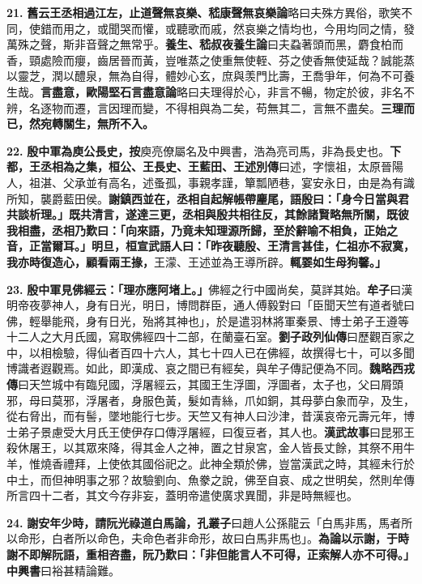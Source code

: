 \textbf{21.} \textbf{舊云王丞相過江左，止道聲無哀樂、}{\footnotesize \textbf{嵇康聲無哀樂論}略曰夫殊方異俗，歌笑不同，使錯而用之，或聞哭而懽，或聽歌而戚，然哀樂之情均也，今用均同之情，發萬殊之聲，斯非音聲之無常乎。}\textbf{養生、}{\footnotesize \textbf{嵇叔夜養生論}曰夫蝨著頭而黑，麝食柏而香，頸處險而癭，齒居晉而黃，豈唯蒸之使重無使輊、芬之使香無使延哉？誠能蒸以靈芝，潤以醴泉，無為自得，體妙心玄，庶與羡門比壽，王喬爭年，何為不可養生哉。}\textbf{言盡意，}{\footnotesize \textbf{歐陽堅石言盡意論}略曰夫理得於心，非言不暢，物定於彼，非名不辨，名逐物而遷，言因理而變，不得相與為二矣，苟無其二，言無不盡矣。}\textbf{三理而已，然宛轉關生，無所不入。}

\textbf{22.} \textbf{殷中軍為庾公長史，}{\footnotesize \textbf{按}庾亮僚屬名及中興書，浩為亮司馬，非為長史也。}\textbf{下都，王丞相為之集，桓公、王長史、王藍田、}{\footnotesize \textbf{王述別傳}曰述，字懷祖，太原晉陽人，祖湛、父承並有高名，述蚤孤，事親孝謹，簞瓢陋巷，宴安永日，由是為有識所知，襲爵藍田侯。}\textbf{謝鎮西並在，丞相自起解帳帶麈尾，語殷曰：「身今日當與君共談析理。」既共清言，遂達三更，丞相與殷共相往反，其餘諸賢略無所關，既彼我相盡，丞相乃歎曰：「向來語，乃竟未知理源所歸，至於辭喻不相負，正始之音，正當爾耳。」明旦，桓宣武語人曰：「昨夜聽殷、王清言甚佳，仁祖亦不寂寞，我亦時復造心，顧看兩王掾，}{\footnotesize 王濛、王述並為王導所辟。}\textbf{輒翣如生母狗馨。」}

\textbf{23.} \textbf{殷中軍見佛經云：「理亦應阿堵上。」}{\footnotesize 佛經之行中國尚矣，莫詳其始。\textbf{牟子}曰漢明帝夜夢神人，身有日光，明日，博問群臣，通人傅毅對曰「臣聞天竺有道者號曰佛，輕舉能飛，身有日光，殆將其神也」，於是遣羽林將軍秦景、博士弟子王遵等十二人之大月氏國，寫取佛經四十二部，在蘭臺石室。\textbf{劉子政列仙傳}曰歷觀百家之中，以相檢驗，得仙者百四十六人，其七十四人已在佛經，故撰得七十，可以多聞博識者遐觀焉。如此，即漢成、哀之間已有經矣，與牟子傳記便為不同。\textbf{魏略西戎傳}曰天竺城中有臨兒國，浮屠經云，其國王生浮圖，浮圖者，太子也，父曰屑頭邪，母曰莫邪，浮屠者，身服色黃，髮如青絲，爪如銅，其母夢白象而孕，及生，從右脅出，而有髻，墜地能行七步。天竺又有神人曰沙津，昔漢哀帝元壽元年，博士弟子景慮受大月氏王使伊存口傳浮屠經，曰復豆者，其人也。\textbf{漢武故事}曰昆邪王殺休屠王，以其眾來降，得其金人之神，置之甘泉宮，金人皆長丈餘，其祭不用牛羊，惟燒香禮拜，上使依其國俗祀之。此神全類於佛，豈當漢武之時，其經未行於中土，而但神明事之邪？故驗劉向、魚豢之說，佛至自哀、成之世明矣，然則牟傳所言四十二者，其文今存非妄，蓋明帝遣使廣求異聞，非是時無經也。}

\textbf{24.} \textbf{謝安年少時，請阮光祿道白馬論，}{\footnotesize \textbf{孔叢子}曰趙人公孫龍云「白馬非馬，馬者所以命形，白者所以命色，夫命色者非命形，故曰白馬非馬也」。}\textbf{為論以示謝，于時謝不即解阮語，重相咨盡，阮乃歎曰：「非但能言人不可得，正索解人亦不可得。」}{\footnotesize \textbf{中興書}曰裕甚精論難。}

